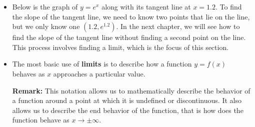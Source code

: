 \documentclass[handout]{ximera}  %
\begin{document}
\begin{itemize}
    \vspace{0.2in}
    \item[] Below is the graph of $y=e^x$ along
    with its tangent line at $x=1.2.$  To find the slope of the tangent line, we need to
    know two points that lie on the line, but we only know one $(1.2,
    e^{1.2}).$ In the next chapter, we will see how to find the slope
    of the tangent line without finding a second point on the line.
    This process involves finding a limit, which is the focus of this
    section.
    
    
    
    
    \vspace{0.1in}
    
    \hspace{0.4in}
    
    
    \vspace{0.2in}
    \item The most basic use of \textbf{limits} is to
    describe how a function $y=f(x)$ behaves as $x$ approaches a
    particular value.
    
    
    
    \newpage
    
    \textbf{Remark:} This notation allows us to mathematically describe the behavior of a function around a point at
    which it is undefined or discontinuous.  It also allows us to describe the end behavior of the function, that is how does
    the function behave as $x \rightarrow \pm \infty$.
    

\end{itemize}
\end{document}
